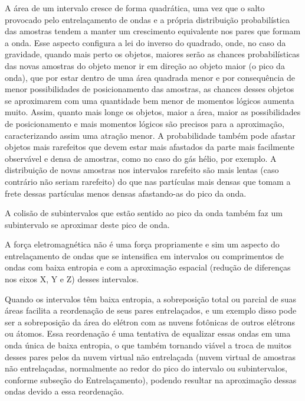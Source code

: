 A área de um intervalo cresce de forma quadrática, uma vez que o salto provocado pelo entrelaçamento de ondas e a própria distribuição probabilística das amostras tendem a manter um crescimento equivalente nos pares que formam a onda. Esse aspecto configura a lei do inverso do quadrado, onde, no caso da gravidade, quando mais perto os objetos, maiores serão as chances probabilísticas das novas amostras do objeto menor ir em direção ao objeto maior (o pico da onda), que por estar dentro de uma área quadrada menor e por consequência de menor possibilidades de posicionamento das amostras, as chances desses objetos se aproximarem com uma quantidade bem menor de momentos lógicos aumenta muito. Assim, quanto mais longe os objetos, maior a área, maior as possibilidades de posicionamento e mais momentos lógicos são precisos para a aproximação, caracterizando assim uma atração menor. A probabilidade também pode afastar objetos mais rarefeitos que devem estar mais afastados da parte mais facilmente observável e densa de amostras, como no caso do gás hélio, por exemplo. A distribuição de novas amostras nos intervalos rarefeito são mais lentas (caso contrário não seriam rarefeito) do que nas partículas mais densas que tomam a frete dessas partículas menos densas afastando-as do pico da onda. 

A colisão de subintervalos que estão sentido ao pico da onda também faz um subintervalo se aproximar deste pico de onda.

A força eletromagnética não é uma força propriamente e sim um aspecto do entrelaçamento de ondas que se intensifica em intervalos ou comprimentos de ondas com baixa entropia e com a aproximação espacial (redução de diferenças nos eixos X, Y e Z) desses intervalos.

Quando os intervalos têm baixa entropia, a sobreposição total ou parcial de suas áreas facilita a reordenação de seus pares entrelaçados, e um exemplo disso pode ser a sobreposição da área do elétron com as nuvens fotônicas de outros elétrons ou átomos. Essa reordenação é uma tentativa de equalizar essas ondas em uma onda única de baixa entropia, o que também tornando viável a troca de muitos desses pares pelos da nuvem virtual não entrelaçada (nuvem virtual de amostras não entrelaçadas, normalmente ao redor do pico do intervalo ou subintervalos, conforme subseção do Entrelaçamento), podendo resultar na aproximação dessas ondas devido a essa reordenação.

